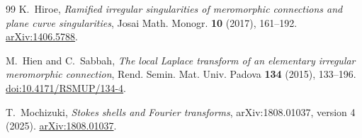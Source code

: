 \documentclass[11pt,a4paper]{amsart}
\theoremstyle{plain}
\theoremstyle{definition}
\begin{document}
\begin{thebibliography}{99}
K.~Hiroe,
\emph{Ramified irregular singularities of meromorphic connections and plane curve singularities},
Josai Math. Monogr. \textbf{10} (2017), 161--192.
\href{https://arxiv.org/abs/1406.5788}{arXiv:1406.5788}.

M.~Hien and C.~Sabbah,
\emph{The local Laplace transform of an elementary irregular meromorphic connection},
Rend. Semin. Mat. Univ. Padova \textbf{134} (2015), 133--196.
\href{https://doi.org/10.4171/RSMUP/134-4}{doi:10.4171/RSMUP/134-4}.

T.~Mochizuki,
\emph{Stokes shells and Fourier transforms},
arXiv:1808.01037, version 4 (2025).
\href{https://arxiv.org/abs/1808.01037}{arXiv:1808.01037}.

\enlargethispage{3\baselineskip}
\end{thebibliography}
\end{document}
